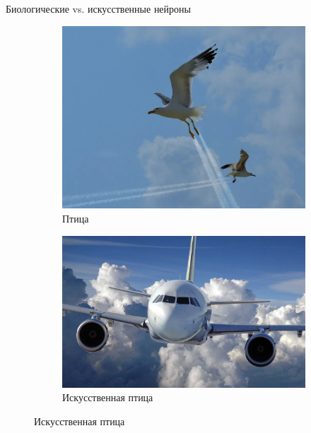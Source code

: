 \documentclass[aspectratio=169]{beamer}
\begin{document}
\begin{frame}{Биологические vs. искусственные нейроны}
    \begin{figure}
        \begin{subfigure}[b]{.4\linewidth}
            \centering
            \includegraphics[width=\linewidth]{graphs/fig7.jpg}
            \caption*{Птица}
        \end{subfigure}
        \begin{subfigure}[b]{.59\linewidth}
            \centering
            \includegraphics[width=.81\linewidth]{graphs/fig8.jpg}
            \caption*{Искусственная птица}
        \end{subfigure}
    \end{figure}
\end{frame}
\end{document}
